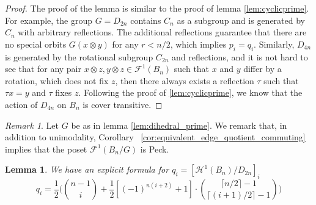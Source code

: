 \documentclass{amsart}
\newtheorem{lem}[thm]{Lemma}
\theoremstyle{remark}
\newtheorem{rem}[thm]{Remark}
\newcommand\fbn{\mathcal H}
\begin{document}
\begin{proof}
The proof of the lemma is similar to the proof of lemma \ref{lem:cyclicprime}. For example, the group $G = D_{2n}$ contains $C_n$ as a subgroup and is generated by $C_n$ with arbitrary reflections. The additional reflections guarantee that there are no special orbits $G(x \otimes y)$ for any $r < n/2$, which implies $p_i = q_i$. Similarly, $D_{4n}$ is generated by the rotational subgroup $C_{2n}$ and reflections, and it is not hard to see that for any pair $x \otimes z, y \otimes z \in \mathcal F^1(B_n)$ such that $x$ and $y$ differ by a rotation, which does not fix $z$, then there always exists a reflection $\tau$ such that $\tau x = y$ and $\tau$ fixes $z$. Following the proof of \ref{lem:cyclicprime}, we know that the action of $D_{4n}$ on $B_n$ is cover transitive.
\end{proof}

\begin{rem}
 Let $G$ be as in lemma \ref{lem:dihedral_prime}. We remark that, in addition to unimodality, Corollary ~\ref{cor:equivalent_edge_quotient_commuting} implies that the poset $\mathcal F^1(B_n/G)$ is Peck.
\end{rem}


\begin{lem}{\label{dihedral002}}
 We have an explicit formula for $q_i = [\fbn^1 (B_n)/D_{2n}]_i$
$$q_i = \frac{1}{2} \Big( {n-1 \choose i } + \frac{1}{2} [(-1)^{n(i+2)}+1] \cdot { \lceil n/2\rceil -1  \choose \lceil (i+1)/2 \rceil - 1}  \Big)$$
\end{lem}
\end{document}

